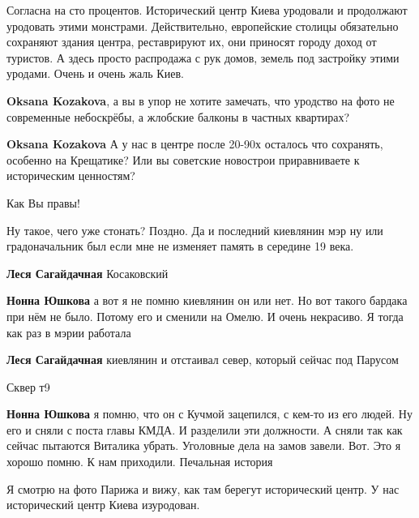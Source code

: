 \begin{itemize}

Согласна на сто процентов. Исторический центр Киева уродовали и продолжают
уродовать этими монстрами. Действительно, европейские столицы обязательно
сохраняют здания центра, реставрируют их, они приносят городу доход от
туристов. А здесь просто распродажа с рук домов, земель под застройку этими
уродами. Очень и очень жаль Киев.

\begin{itemize} %
\textbf{Oksana Kozakova}, а вы в упор не хотите замечать, что уродство на фото не современные небоскрёбы, а жлобские балконы в частных квартирах?

\textbf{Oksana Kozakova} А у нас в центре после 20-90х осталось что сохранять, особенно на Крещатике? Или вы советские новострои приравниваете к историческим ценностям?
\end{itemize} %

Как Вы правы!


Ну такое, чего уже стонать? Поздно. Да и последний киевлянин мэр ну или
градоначальник был если мне не изменяет память в середине 19 века.

\begin{itemize} %
\textbf{Леся Сагайдачная} Косаковский

\begin{itemize} %
\textbf{Нонна Юшкова} а вот я не помню киевлянин он или нет. Но вот такого бардака при нём не было. Потому его и сменили на Омелю. И очень некрасиво. Я тогда как раз в мэрии работала

\textbf{Леся Сагайдачная} киевлянин и отстаивал север, который сейчас под Парусом

Сквер т9

\textbf{Нонна Юшкова} я помню, что он с Кучмой зацепился, с кем-то из его людей. Ну его и сняли с поста главы КМДА. И разделили эти должности. А сняли так как сейчас пытаются Виталика убрать. Уголовные дела на замов завели. Вот. Это я хорошо помню. К нам приходили. Печальная история
\end{itemize} %

\end{itemize} %


Я смотрю на фото Парижа и вижу, как там берегут исторический центр. У нас
исторический центр Киева изуродован.


\end{itemize}

